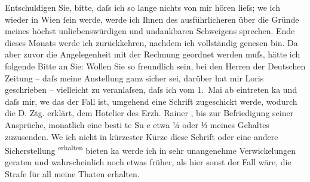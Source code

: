                Entschuldigen Sie, bitte, daſs ich so lange nichts von mir hören lieſs; we
               {\geminationn}
                ich wieder in 
               Wien
               ſein werde, werde ich Ihnen des ausführlicheren
               über die Gründe meines höchst unliebenswürdigen und undankbaren Schweigens sprechen.
               Ende dieses Monats werde ich zurückkehren, nachdem ich vollständig genesen bin. Da
               aber zuvor die Angelegenheit mit der Rechnung geordnet werden muſs, hätte ich
               folgende Bitte an Sie: Wollen Sie so freundlich sein, bei den Herren der 
               Deutschen Zeitung
                – daſs meine Anstellung ganz
               sicher sei, darüber hat mir 
               Loris
                geschrieben
               – vielleicht zu veranlaſsen, daſs ich vom 
               1. Mai
                ab eintreten ka
               {\geminationn}
                und 
                daſs mir, we
               {\geminationn}
                das der Fall ist, umgehend eine Schrift zugeschickt
               werde, wodurch die 
               D. Ztg.
                erklärt, dem 
               Hotelier
                des 
               Erzh. Rainer
               , bis zur Befriedigung seiner
               Ansprüche, monatlich eine besti
               {\geminationm}
               te Su
               {\geminationm}
               e etwa ¼ 
               \introOben{}oder ⅓\introOben{}
                meines
               Gehaltes zuzusenden. We
               {\geminationn}
                ich nicht in kürzester Kürze
               diese Schrift oder eine andere Sicherstellung 
               \substVorne{}\textsuperscript{erhalten}\substDazwischen{}
                     bieten ka
                     {\geminationn}\substHinten{}{ }{\pb}
               werde ich in sehr unangenehme Verwickelungen geraten
               und wahrscheinlich noch etwas früher, als hier sonst der Fall wäre, die Strafe für
               all meine Thaten erhalten.
            \pend
           
